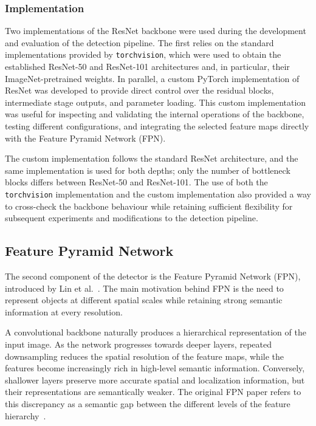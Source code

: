 \documentclass[11pt,a4paper]{article}
\begin{document}
\subsubsection{Implementation}
\label{subsubsec:resnet_implementation}

Two implementations of the ResNet backbone were used during the development
and evaluation of the detection pipeline. The first relies on the standard
implementations provided by \texttt{torchvision}, which were used to obtain
the established ResNet-50 and ResNet-101 architectures and, in particular,
their ImageNet-pretrained weights. In parallel, a custom PyTorch
implementation of ResNet was developed to provide direct control over the
residual blocks, intermediate stage outputs, and parameter loading. This
custom implementation was useful for inspecting and validating the internal
operations of the backbone, testing different configurations, and integrating
the selected feature maps directly with the Feature Pyramid Network (FPN).

The custom implementation follows the standard ResNet architecture, and the
same implementation is used for both depths; only the number of bottleneck
blocks differs between ResNet-50 and ResNet-101. The use of both the
\texttt{torchvision} implementation and the custom implementation also
provided a way to cross-check the backbone behaviour while retaining
sufficient flexibility for subsequent experiments and modifications to the
detection pipeline.

\subsection{Feature Pyramid Network}
\label{subsec:fpn}

The second component of the detector is the Feature Pyramid Network (FPN),
introduced by Lin et al.~\cite{lin2017fpn}. The main motivation behind FPN is
the need to represent objects at different spatial scales while retaining
strong semantic information at every resolution.

A convolutional backbone naturally produces a hierarchical representation of
the input image. As the network progresses towards deeper layers, repeated
downsampling reduces the spatial resolution of the feature maps, while the
features become increasingly rich in high-level semantic information.
Conversely, shallower layers preserve more accurate spatial and localization
information, but their representations are semantically weaker. The original
FPN paper refers to this discrepancy as a semantic gap between the different
levels of the feature hierarchy~\cite{lin2017fpn}.
\end{document}
